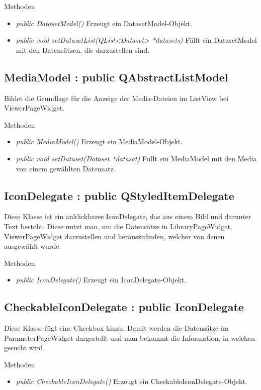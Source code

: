 Methoden
\begin{itemize}
	\item\textit{public DatasetModel()}
	Erzeugt ein DatasetModel-Objekt.
	\item\textit{public void setDatasetList(QList<Dataset> *datasets)}
	Füllt ein DatasetModel mit den Datensätzen, die darzustellen sind.
\end{itemize}

\subsection*{MediaModel : public QAbstractListModel}
Bildet die Grundlage für die Anzeige der Media-Dateien im ListView bei ViewerPageWidget.

Methoden
\begin{itemize}
	\item\textit{public MediaModel()}
	Erzeugt ein MediaModel-Objekt.
	\item\textit{public void setDataset(Dataset *dataset)}
	Füllt ein MediaModel mit den Media von einem gewählten Datensatz.
\end{itemize}

\subsection*{IconDelegate : public QStyledItemDelegate}
Diese Klasse ist ein anklickbares IconDelegate, das aus einem Bild und darunter Text besteht. Diese nutzt man, um die Datensätze in LibraryPageWidget, ViewerPageWidget darzustellen und herauszufinden, welcher von denen ausgewählt wurde.

Methoden
\begin{itemize}
	\item\textit{public IconDelegate()}
	Erzeugt ein IconDelegate-Objekt.
\end{itemize}

\subsection*{CheckableIconDelegate : public IconDelegate}
Diese Klasse fügt eine Checkbox hinzu. Damit werden die Datensätze im ParameterPageWidget dargestellt und man bekommt die Information, in welchen gesucht wird.

Methoden
\begin{itemize}
	\item\textit{public CheckableIconDelegate()}
	Erzeugt ein CheckableIconDelegate-Objekt.
\end{itemize} 

